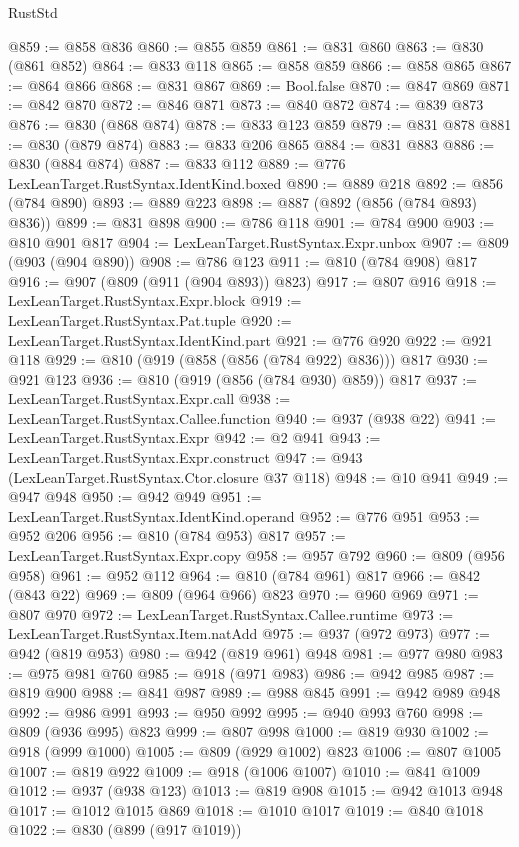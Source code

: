 \begin{lexlean}{RustStd}
\begin{coremodule}
@859 := @858 @836
@860 := @855 @859
@861 := @831 @860
@863 := @830 (@861 @852)
@864 := @833 @118
@865 := @858 @859
@866 := @858 @865
@867 := @864 @866
@868 := @831 @867
@869 := Bool.false
@870 := @847 @869
@871 := @842 @870
@872 := @846 @871
@873 := @840 @872
@874 := @839 @873
@876 := @830 (@868 @874)
@878 := @833 @123 @859
@879 := @831 @878
@881 := @830 (@879 @874)
@883 := @833 @206 @865
@884 := @831 @883
@886 := @830 (@884 @874)
@887 := @833 @112
@889 := @776 LexLeanTarget.RustSyntax.IdentKind.boxed
@890 := @889 @218
@892 := @856 (@784 @890)
@893 := @889 @223
@898 := @887 (@892 (@856 (@784 @893) @836))
@899 := @831 @898
@900 := @786 @118
@901 := @784 @900
@903 := @810 @901 @817
@904 := LexLeanTarget.RustSyntax.Expr.unbox
@907 := @809 (@903 (@904 @890))
@908 := @786 @123
@911 := @810 (@784 @908) @817
@916 := @907 (@809 (@911 (@904 @893)) @823)
@917 := @807 @916
@918 := LexLeanTarget.RustSyntax.Expr.block
@919 := LexLeanTarget.RustSyntax.Pat.tuple
@920 := LexLeanTarget.RustSyntax.IdentKind.part
@921 := @776 @920
@922 := @921 @118
@929 := @810 (@919 (@858 (@856 (@784 @922) @836))) @817
@930 := @921 @123
@936 := @810 (@919 (@856 (@784 @930) @859)) @817
@937 := LexLeanTarget.RustSyntax.Expr.call
@938 := LexLeanTarget.RustSyntax.Callee.function
@940 := @937 (@938 @22)
@941 := LexLeanTarget.RustSyntax.Expr
@942 := @2 @941
@943 := LexLeanTarget.RustSyntax.Expr.construct
@947 := @943 (LexLeanTarget.RustSyntax.Ctor.closure @37 @118)
@948 := @10 @941
@949 := @947 @948
@950 := @942 @949
@951 := LexLeanTarget.RustSyntax.IdentKind.operand
@952 := @776 @951
@953 := @952 @206
@956 := @810 (@784 @953) @817
@957 := LexLeanTarget.RustSyntax.Expr.copy
@958 := @957 @792
@960 := @809 (@956 @958)
@961 := @952 @112
@964 := @810 (@784 @961) @817
@966 := @842 (@843 @22)
@969 := @809 (@964 @966) @823
@970 := @960 @969
@971 := @807 @970
@972 := LexLeanTarget.RustSyntax.Callee.runtime
@973 := LexLeanTarget.RustSyntax.Item.natAdd
@975 := @937 (@972 @973)
@977 := @942 (@819 @953)
@980 := @942 (@819 @961) @948
@981 := @977 @980
@983 := @975 @981 @760
@985 := @918 (@971 @983)
@986 := @942 @985
@987 := @819 @900
@988 := @841 @987
@989 := @988 @845
@991 := @942 @989 @948
@992 := @986 @991
@993 := @950 @992
@995 := @940 @993 @760
@998 := @809 (@936 @995) @823
@999 := @807 @998
@1000 := @819 @930
@1002 := @918 (@999 @1000)
@1005 := @809 (@929 @1002) @823
@1006 := @807 @1005
@1007 := @819 @922
@1009 := @918 (@1006 @1007)
@1010 := @841 @1009
@1012 := @937 (@938 @123)
@1013 := @819 @908
@1015 := @942 @1013 @948
@1017 := @1012 @1015 @869
@1018 := @1010 @1017
@1019 := @840 @1018
@1022 := @830 (@899 (@917 @1019))

\end{coremodule}
\end{lexlean}
